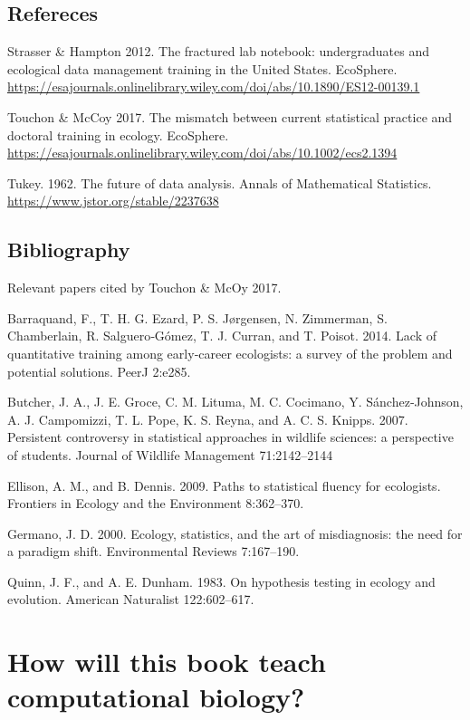 \documentclass[
]{book}
\begin{document}
\hypertarget{refereces}{%
\section{Refereces}\label{refereces}}

Strasser \& Hampton 2012. The fractured lab notebook: undergraduates and ecological data management training in the United States. EcoSphere. \url{https://esajournals.onlinelibrary.wiley.com/doi/abs/10.1890/ES12-00139.1}

Touchon \& McCoy 2017. The mismatch between current statistical practice and doctoral training in ecology. EcoSphere. \url{https://esajournals.onlinelibrary.wiley.com/doi/abs/10.1002/ecs2.1394}

Tukey. 1962. The future of data analysis. Annals of Mathematical Statistics. \url{https://www.jstor.org/stable/2237638}

\hypertarget{bibliography}{%
\section{Bibliography}\label{bibliography}}

Relevant papers cited by Touchon \& McOy 2017.

Barraquand, F., T. H. G. Ezard, P. S. Jørgensen, N. Zimmerman, S. Chamberlain, R. Salguero‐Gómez, T. J. Curran, and T. Poisot. 2014. Lack of quantitative training among early‐career ecologists: a survey of the problem and potential solutions. PeerJ 2:e285.

Butcher, J. A., J. E. Groce, C. M. Lituma, M. C. Cocimano, Y. Sánchez‐Johnson, A. J. Campomizzi, T. L. Pope, K. S. Reyna, and A. C. S. Knipps. 2007. Persistent controversy in statistical approaches in wildlife sciences: a perspective of students. Journal of Wildlife Management 71:2142--2144

Ellison, A. M., and B. Dennis. 2009. Paths to statistical fluency for ecologists. Frontiers in Ecology and the Environment 8:362--370.

Germano, J. D. 2000. Ecology, statistics, and the art of misdiagnosis: the need for a paradigm shift. Environmental Reviews 7:167--190.

Quinn, J. F., and A. E. Dunham. 1983. On hypothesis testing in ecology and evolution. American Naturalist 122:602--617.

\hypertarget{how-will-this-book-teach-computational-biology}{%
\chapter{How will this book teach computational biology?}\label{how-will-this-book-teach-computational-biology}}
\end{document}
